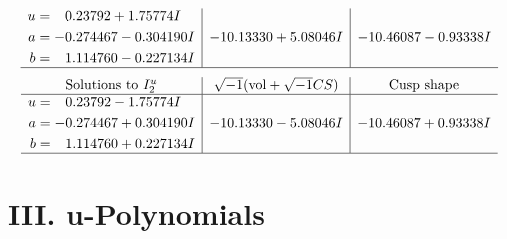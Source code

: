 \documentclass[1p]{elsarticle_modified}
\theoremstyle{definition}
\newcommand{\I}{\sqrt{-1}}
\begin{document}
$$\begin{array}{c|c|c}
\begin{aligned}
u &= \phantom{-}0.23792 + 1.75774 I \\
a &= -0.274467 - 0.304190 I \\
b &= \phantom{-}1.114760 - 0.227134 I\end{aligned}
 & -10.13330 + 5.08046 I & -10.46087 - 0.93338 I\\
 \hline 
 \end{array}$$\newpage$$\begin{array}{c|c|c}  
\text{Solutions to }I^u_{2}& \I (\text{vol} + \sqrt{-1}CS) & \text{Cusp shape}\\
 \hline 
\begin{aligned}
u &= \phantom{-}0.23792 - 1.75774 I \\
a &= -0.274467 + 0.304190 I \\
b &= \phantom{-}1.114760 + 0.227134 I\end{aligned}
 & -10.13330 - 5.08046 I & -10.46087 + 0.93338 I\\
 \hline 
 \end{array}$$\newpage
\newpage\renewcommand{\arraystretch}{1}
\centering \section*{ III. u-Polynomials}
\end{document}
